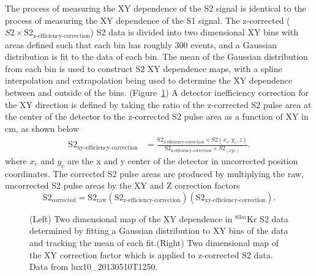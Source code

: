 The process of measuring the XY dependence of the S2 signal is identical to the process of measuring the XY dependence of the S1 signal.  The z-corrected ($S2 \times \mbox{S}2_{\mbox{z-efficiency-correction}}$) S2 data is divided into two dimensional XY bins with areas defined such that each bin has roughly 300 events, and a Gaussian distribution is fit to the data of each bin.  The mean of the Gaussian distribution from each bin is used to construct S2 XY dependence maps, with a spline interpolation and extrapolation being used to determine the XY dependence between and outside of the bins. (Figure~\ref{fig:KrypCalS2XYDep}) A detector inefficiency correction for the XY direction is defined by taking the ratio of the z-corrected S2 pulse area at the center of the detector to the z-corrected S2 pulse area as a function of XY in cm, as shown below
\begin{align}
\mbox{S}2_{\mbox{xy-efficiency-correction}} &= \frac{\mbox{S}2_{\mbox{z-efficiency-correction}}\times S2(x_c,y_c,z)}{\mbox{S}2_{\mbox{z-efficiency-correction}}\times S2_(xyz)}.
\end{align} 
where $x_c$ and $y_c$ are the x and y center of the detector in uncorrected position coordinates. The corrected S2 pulse areas are produced by multiplying the raw, uncorrected S2 pulse areas by the XY and Z correction factors
\begin{equation}
\mbox{S}2_{\mbox{corrected}} = \mbox{S}2_{\mbox{raw}} \left( \mbox{S}2_{\mbox{z-efficiency-correction}} \right) \left( \mbox{S}2_{\mbox{xy-efficiency-correction}} \right).
\end{equation}

\begin{figure} 
\centering
{}
\qquad
{}
\caption{ (Left) Two dimensional map of the XY dependence in $^{83m}$Kr S2 data determined by fitting a Gaussian distribution to XY bins of the data and tracking the mean of each fit.(Right) Two dimensional map of the XY correction factor which is applied to z-corrected S2 data. Data from lux10\_20130510T1250.}
\label{fig:KrypCalS2XYDep}
\end{figure}

